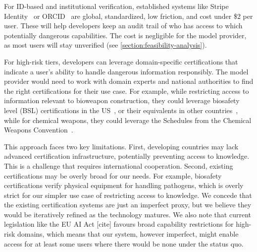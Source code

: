 \documentclass{article}
\theoremstyle{plain}
\theoremstyle{definition}
\theoremstyle{remark}
\begin{document}
For ID-based and institutional verification, established systems like Stripe Identity~\cite{stripe_identity_2024} or ORCID~\cite{orcid_2024} are global, standardized, low friction, and cost under \$2 per user.
These will help developers keep an audit trail of who has access to which potentially dangerous capabilities.
The cost is negligible for the model provider, as most users will stay unverified (see \cref{section:feasibility-analysis}).

For high-risk tiers, developers can leverage domain-specific certifications that indicate a user's ability to handle dangerous information responsibly.
The model provider would need to work with domain experts and national authorities to find the right certifications for their use case.
For example, while restricting access to information relevant to bioweapon construction, they could leverage biosafety level (BSL) certifications in the US~\cite{CDC_BMBL_2020}, or their equivalents in other countries~\cite{EU_Directive_2000_54_EC}, while for chemical weapons, they could leverage the Schedules from the Chemical Weapons Convention~\cite{OPCW_CWC_1993}.

This approach faces two key limitations.
First, developing countries may lack advanced certification infrastructure, potentially preventing access to knowledge.
This is a challenge that requires international cooperation.
Second, existing certifications may be overly broad for our needs.
For example, biosafety certifications verify physical equipment for handling pathogens, which is overly strict for our simpler use case of restricting access to knowledge.
We concede that the existing certification systems are just an imperfect proxy, but we believe they would be iteratively refined as the technology matures.
We also note that current legislation like the EU AI Act [cite] favours broad capability restrictions for high-risk domains, which means that our system, however imperfect, might enable access for at least some users where there would be none under the status quo.

\end{document}
